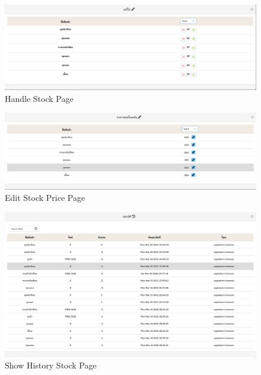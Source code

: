 \begin{figure}
  \begin{center}
  \includegraphics[width=\linewidth]{images/handleStock.png}
  \end{center}
  \caption[หน้าจัดการแก้ไขสต็อกของ]{Handle Stock Page}
  \label{fig:CheckStock}
  \end{figure}
\begin{figure}
  \begin{center}
  \includegraphics[width=\linewidth]{images/editPrice.png}
  \end{center}
  \caption[หน้าจัดการแก้ไขราคาสินค้า]{Edit Stock Price Page}
  \label{fig:editPrice}
  \end{figure}
\begin{figure}
  \begin{center}
  \includegraphics[width=\linewidth]{images/historyStock.png}
  \end{center}
  \caption[หน้าแสดงประวัติการเพิ่มลดของ]{Show History Stock Page}
  \label{fig:HistoryStock}
  \end{figure}
